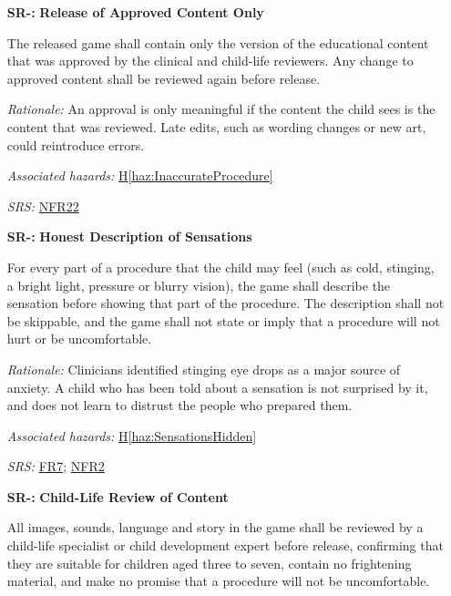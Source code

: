 \documentclass{article}
\newcounter{hazard}
\newcommand{\hazref}[1]{\hyperref[haz:#1]{H\ref*{haz:#1}}}
\newcounter{sr}
\newcommand{\srdef}[1]{\refstepcounter{sr}\label{sr:#1}\textbf{SR-\thesr:}}
\newcommand{\srsurl}{https://team-hindsight.github.io/ophthamology-game/SRS-IEEE/SRS.pdf}
\newcommand{\srsfrref}[2]{\href{\srsurl\#nameddest=#1}{FR#2}}
\newcommand{\srsnfrref}[2]{\href{\srsurl\#nameddest=#1}{NFR#2}}
\begin{document}
\begin{itemize}[leftmargin=1.5cm, labelwidth=1.3cm, labelsep=0.2cm,
  align=left, itemsep=1.2em, parsep=0.6em]
The game shall tell the child, in words and pictures suited to their age,
that their doctor may do things a little differently from the game.

\textit{Rationale:} Procedures vary between patients, clinicians and clinics
(Assumption~5). Telling the child this in advance means a difference at the
visit is less likely to surprise or upset them.

\textit{Associated hazards:} \hazref{InaccurateProcedure}

\textit{SRS:} \srsfrref{FR_ClinicsDiffer}{8}

\item[\srdef{ApprovedContent}] \textbf{Release of Approved Content Only}

The released game shall contain only the version of the educational content
that was approved by the clinical and child-life reviewers. Any change to
approved content shall be reviewed again before release.

\textit{Rationale:} An approval is only meaningful if the content the child
sees is the content that was reviewed. Late edits, such as wording changes or
new art, could reintroduce errors.

\textit{Associated hazards:} \hazref{InaccurateProcedure}

\textit{SRS:} \srsnfrref{NFR_Integrity}{22}

\item[\srdef{HonestSensations}] \textbf{Honest Description of Sensations}

For every part of a procedure that the child may feel (such as cold, stinging,
a bright light, pressure or blurry vision), the game shall describe the
sensation before showing that part of the procedure. The description shall
not be skippable, and the game shall not state or imply that a procedure will
not hurt or be uncomfortable.

\textit{Rationale:} Clinicians identified stinging eye drops as a major source
of anxiety. A child who has been told about a sensation is not surprised by
it, and does not learn to distrust the people who prepared them.

\textit{Associated hazards:} \hazref{SensationsHidden}

\textit{SRS:} \srsfrref{FR_DescribeSensations}{7}; \srsnfrref{NFR_ChildSafe}{2}

\item[\srdef{ChildLifeReview}] \textbf{Child-Life Review of Content}

All images, sounds, language and story in the game shall be reviewed by a
child-life specialist or child development expert before release, confirming
that they are suitable for children aged three to seven, contain no
frightening material, and make no promise that a procedure will not be
uncomfortable.


\end{itemize}
\end{document}
